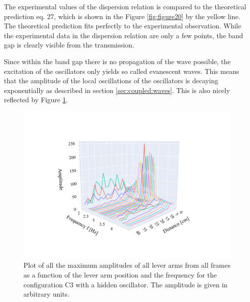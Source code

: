 \documentclass[12pt]{article}
\begin{document}
The experimental values of the dispersion relation is compared to the theoretical prediction eq. 27, which is shown in the Figure \ref{fig:figure20} by the yellow line. The theoretical prediction fits perfectly to the experimental observation. While the experimental data in the dispersion relation are only a few points, the band gap is clearly visible from the transmission.

Since within the band gap there is no propagation of the wave possible, the excitation of the oscillators only yields so called evanescent waves. This means that the amplitude of the local oscillations of the oscillators is decaying exponentially as described in section \ref{sec:coupled:waves}. This is also nicely reflected by Figure \ref{fig:figure21}.
\begin{figure}[hbt] 
\includegraphics[width=.8\textwidth]{results/evanescent.pdf}
\caption{Plot of all the maximum amplitudes of all lever arms from all frames  as a function of the lever arm position and the frequency for the configuration C3 with a hidden oscillator. The amplitude is given in arbitrary units. }\label{fig:figure21}
\end{figure}
\end{document}
